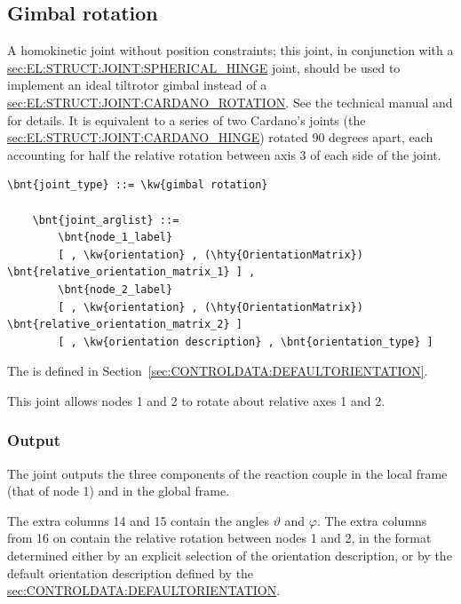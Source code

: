 \subsection{Gimbal rotation}\label{sec:EL:JOINT:GIMBALROTATION}
A homokinetic joint without position constraints;
this joint, in conjunction with a
\hyperref{\kw{spherical hinge}}{\kw{spherical hinge} (see Section~}{)}{sec:EL:STRUCT:JOINT:SPHERICAL_HINGE}
joint, should be used to implement an ideal tiltrotor gimbal
instead of a
\hyperref{\kw{Cardano rotation}}{\kw{Cardano rotation} (see Section~}{)}{sec:EL:STRUCT:JOINT:CARDANO_ROTATION}.
See the technical manual and \cite{GIMBAL-2008} for details.
It is equivalent to a series of two Cardano's joints
(the \hyperref{\kw{Cardano hinge}}{\kw{Cardano hinge}, see Section~}{}{sec:EL:STRUCT:JOINT:CARDANO_HINGE})
rotated 90 degrees apart, each accounting for half the relative rotation
between axis 3 of each side of the joint.
\begin{Verbatim}[commandchars=\\\{\}]
    \bnt{joint_type} ::= \kw{gimbal rotation}

    \bnt{joint_arglist} ::= 
        \bnt{node_1_label}
        [ , \kw{orientation} , (\hty{OrientationMatrix}) \bnt{relative_orientation_matrix_1} ] ,
        \bnt{node_2_label}
        [ , \kw{orientation} , (\hty{OrientationMatrix}) \bnt{relative_orientation_matrix_2} ]
        [ , \kw{orientation description} , \bnt{orientation_type} ]
\end{Verbatim}
The  is defined
in Section~\ref{sec:CONTROLDATA:DEFAULTORIENTATION}.

This joint allows nodes 1 and 2 to rotate about relative axes 1 and 2.

\subsubsection{Output}
The  joint outputs the three components
of the reaction couple in the local frame (that of node 1) 
and in the global frame.

The extra columns 14 and 15 contain the angles $\vartheta$ and $\varphi$.
The extra columns from 16 on contain the relative rotation
between nodes 1 and 2, in the format determined either by an explicit
selection of the orientation description, or by the default
orientation description defined by the 
\hyperref{\kw{default orientation} keyword}{\kw{default orientation} keyword (see Section~}{)}{sec:CONTROLDATA:DEFAULTORIENTATION}.

